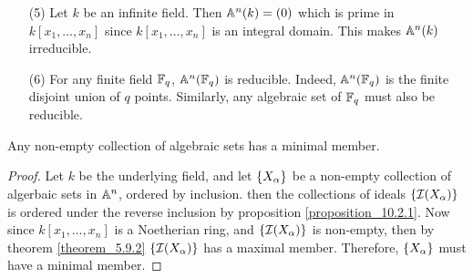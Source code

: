 \begin{example}
\begin{enumerate}
    \item[(5)] Let $k$ be an infinite field. Then $\mathbb{A}^n(k)=(0)$ which
      is prime in $k[x_1, \dots, x_n]$ since $k[x_1, \dots, x_n]$ is
      an integral domain. This makes $\mathbb{A}^n(k)$ irreducible.

    \item[(6)] For any finite field $\mathbb{F}_q$,  $\mathbb{A}^n(\mathbb{F}_q)$ is
      reducible. Indeed, $\mathbb{A}^n(\mathbb{F}_q)$ is the finite disjoint union of
      $q$ points. Similarly, any algebraic set of $\mathbb{F}_q$ must also be
      reducible.
  \end{enumerate}
\end{example}

\begin{proposition}\label{proposition_10.3.2}
  Any non-empty collection of algebraic sets has a minimal member.
\end{proposition}
\begin{proof}
  Let $k$ be the underlying field, and let $\{X_\alpha\}$ be a non-empty
  collection of algerbaic sets in $\mathbb{A}^n$, ordered by inclusion. then
  the collections of ideals $\{\mathcal{I}(X_\alpha)\}$ is ordered under the
  reverse inclusion by proposition \ref{proposition_10.2.1}. Now
  since $k[x_1, \dots, x_n]$ is a Noetherian ring, and $\{\mathcal{I}(X_\alpha)\}$
  is non-empty, then by theorem \ref{theorem_5.9.2} $\{\mathcal{I}(X_\alpha)\}$
  has a maximal member. Therefore, $\{X_\alpha\}$ must have a minimal
  member.
\end{proof}

